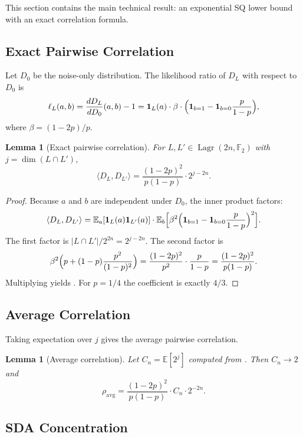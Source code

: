 \documentclass[11pt,a4paper]{article}
\theoremstyle{plain}
\newtheorem{lemma}[theorem]{Lemma}
\theoremstyle{definition}
\newcommand{\F}{\mathbb{F}}
\newcommand{\E}{\mathbb{E}}
\DeclareMathOperator{\Lagr}{Lagr}
\begin{document}
This section contains the main technical result: an exponential SQ lower bound with an exact correlation formula.

\subsection{Exact Pairwise Correlation}
\label{subsec:exact-corr}

Let $D_0$ be the noise-only distribution. The likelihood ratio of $D_L$ with respect to $D_0$ is
\[
\ell_L(a,b) = \frac{dD_L}{dD_0}(a,b) - 1
            = \mathbf{1}_L(a) \cdot \beta \cdot \Bigl(\mathbf{1}_{b=1} - \mathbf{1}_{b=0} \frac{p}{1-p}\Bigr),
\]
where $\beta = (1-2p)/p$.

\begin{lemma}[Exact pairwise correlation]
\label{lem:exact-corr}
For $L,L' \in \Lagr(2n,\F_2)$ with $j = \dim(L \cap L')$,
\begin{equation}
\label{eq:exact-corr}
\langle D_L, D_{L'} \rangle
= \frac{(1-2p)^2}{p(1-p)} \cdot 2^{j-2n}.
\end{equation}
\end{lemma}

\begin{proof}
Because $a$ and $b$ are independent under $D_0$, the inner product factors:
\[
\langle D_L, D_{L'} \rangle
= \E_a[\mathbf{1}_L(a) \mathbf{1}_{L'}(a)] \cdot
  \E_b\Bigl[\beta^2 \Bigl(\mathbf{1}_{b=1} - \mathbf{1}_{b=0}\frac{p}{1-p}\Bigr)^2\Bigr].
\]
The first factor is $|L \cap L'| / 2^{2n} = 2^{j-2n}$. The second factor is
\[
\beta^2 \Bigl(p + (1-p)\frac{p^2}{(1-p)^2}\Bigr)
= \frac{(1-2p)^2}{p^2} \cdot \frac{p}{1-p}
= \frac{(1-2p)^2}{p(1-p)}.
\]
Multiplying yields . For $p=1/4$ the coefficient is exactly $4/3$.
\end{proof}

\subsection{Average Correlation}
\label{subsec:avg-corr}

Taking expectation over $j$ gives the average pairwise correlation.

\begin{lemma}[Average correlation]
Let $C_n = \E[2^j]$ computed from . Then $C_n \to 2$ and
\[
\rho_{\mathrm{avg}}
= \frac{(1-2p)^2}{p(1-p)} \cdot C_n \cdot 2^{-2n}.
\]
\end{lemma}

\subsection{SDA Concentration}
\label{subsec:sda}
\end{document}
